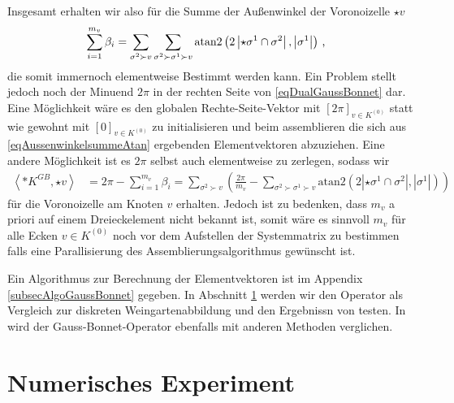     Insgesamt erhalten wir also für die Summe der Außenwinkel der Voronoizelle \( \star v \)
    \begin{align}
      \label{eqAussenwinkelsummeAtan}
      \sum_{i=1}^{m_{v}}\beta_{i} &= \sum_{\sigma^{2}\succ v} \sum_{\sigma^{2}\succ\sigma^{1}\succ v}
                               \text{atan2}\left( 2\left|\star\sigma^{1} \cap \sigma^{2} \right|, 
                                 \left|\sigma^{1}\right|\right) \,\text{,}       
    \end{align}
    die somit immernoch elementweise Bestimmt werden kann.
    Ein Problem stellt jedoch noch der Minuend \( 2\pi \) in der rechten Seite von \ref{eqDualGaussBonnet} dar.
    Eine Möglichkeit wäre es den globalen Rechte-Seite-Vektor mit \( \left[ 2\pi \right]_{v\in K^{(0)}} \) statt wie
    gewohnt mit \( \left[ 0 \right]_{v\in K^{(0)}} \) zu initialisieren und beim assemblieren die sich aus 
    \eqref{eqAussenwinkelsummeAtan} ergebenden Elementvektoren abzuziehen.
    Eine andere Möglichkeit ist es \( 2\pi \) selbst auch elementweise zu zerlegen, sodass wir
    \begin{align}
      \label{eqProbGB}
      \left\langle *K^{GB} , \star v \right\rangle &=
      2\pi - \sum_{i=1}^{m_{v}}\beta_{i} =
          \sum_{\sigma^{2}\succ v} \left( \frac{2\pi}{m_{v}} - \sum_{\sigma^{2}\succ\sigma^{1}\succ v}
                               \text{atan2}\left( 2\left|\star\sigma^{1} \cap \sigma^{2} \right|, 
                                 \left|\sigma^{1}\right|\right) \right)
    \end{align}
    für die Voronoizelle am Knoten \( v \) erhalten. 
    Jedoch ist zu bedenken, dass \( m_{v} \) a priori auf einem Dreieckelement nicht bekannt ist, 
    somit wäre es sinnvoll \( m_{v} \) für alle Ecken \( v\in K^{(0)} \) noch vor dem Aufstellen der Systemmatrix zu bestimmen falls eine
    Parallisierung des Assemblierungsalgorithmus gewünscht ist.

    Ein Algorithmus zur Berechnung der Elementvektoren ist im Appendix \ref{subsecAlgoGaussBonnet} gegeben.
    In Abschnitt \ref{secNumEx} werden wir den Operator als Vergleich zur diskreten Weingartenabbildung und den Ergebnissn von \cite{heine} testen. 
    In \cite{meyer} wird der Gauss-Bonnet-Operator ebenfalls mit anderen Methoden verglichen.

\section{Numerisches Experiment}
\label{secNumEx}
  
